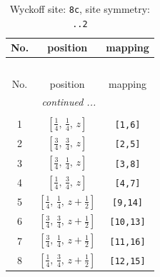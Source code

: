 \documentclass[fleqn,8pt]{jsarticle}
\begin{document}
\renewcommand{\arraystretch}{1.2}
\begin{longtable}{ccc}
\caption{Wyckoff site: {\tt 8c}, site symmetry: {\tt ..2}}
 \\
 \hline \hline
No. & position & mapping \\ \hline \endfirsthead

\multicolumn{2}{l}{\tablename\ \thetable{}} \\
 \hline \hline
No. & position & mapping \\ \hline \endhead

 \hline \hline
\multicolumn{2}{r}{\footnotesize\it continued ...} \\ \endfoot

 \hline \hline
\multicolumn{2}{r}{} \\ \endlastfoot

1 & $\left[ \frac{1}{4},\, \frac{1}{4},\, z \right]$ & {\tt [1,6]} \\ \hline
2 & $\left[ \frac{3}{4},\, \frac{3}{4},\, z \right]$ & {\tt [2,5]} \\ \hline
3 & $\left[ \frac{3}{4},\, \frac{1}{4},\, z \right]$ & {\tt [3,8]} \\ \hline
4 & $\left[ \frac{1}{4},\, \frac{3}{4},\, z \right]$ & {\tt [4,7]} \\ \hline
5 & $\left[ \frac{1}{4},\, \frac{1}{4},\, z + \frac{1}{2} \right]$ & {\tt [9,14]} \\ \hline
6 & $\left[ \frac{3}{4},\, \frac{3}{4},\, z + \frac{1}{2} \right]$ & {\tt [10,13]} \\ \hline
7 & $\left[ \frac{3}{4},\, \frac{1}{4},\, z + \frac{1}{2} \right]$ & {\tt [11,16]} \\ \hline
8 & $\left[ \frac{1}{4},\, \frac{3}{4},\, z + \frac{1}{2} \right]$ & {\tt [12,15]} \\
\end{longtable}
\renewcommand{\arraystretch}{1.2}
\end{document}
